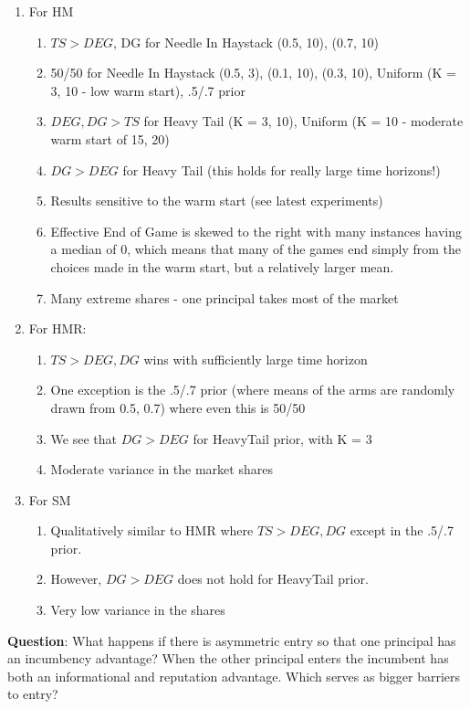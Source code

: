 \documentclass[11pt,letterpaper]{article}
\begin{document}
\begin{enumerate}
\item For HM
\begin{enumerate}
\item $TS > DEG$, DG for Needle In Haystack (0.5, 10), (0.7, 10)
\item 50/50 for Needle In Haystack (0.5, 3), (0.1, 10), (0.3, 10),  Uniform (K = 3, 10 - low warm start), .5/.7 prior
\item $DEG, DG > TS$ for Heavy Tail (K = 3, 10), Uniform (K = 10 - moderate warm start of 15, 20)
\item $DG > DEG$ for Heavy Tail (this holds for really large time horizons!)
\item Results sensitive to the warm start (see latest experiments)
\item Effective End of Game is skewed to the right with many instances having a median of  0, which means that many of the games end simply from the choices made in the warm start, but a relatively larger mean.
\item Many extreme shares - one principal takes most of the market
\end{enumerate}
\item For HMR:
\begin{enumerate}
\item $TS > DEG, DG$ wins with sufficiently large time horizon 
\item One exception is the .5/.7 prior (where means of the arms are randomly drawn from {0.5, 0.7}) where even this is 50/50
\item We see that $DG > DEG$ for HeavyTail prior, with K = 3
\item Moderate variance in the market shares
\end{enumerate}
\item For SM

\begin{enumerate}
\item Qualitatively similar to HMR where $TS > DEG, DG$ except in the .5/.7 prior.
\item However, $DG > DEG$ does not hold for HeavyTail prior.
\item Very low variance in the shares
\end{enumerate}

\end{enumerate}

\textbf{Question}: What happens if there is asymmetric entry so that one principal has an incumbency advantage? When the other principal enters the incumbent has both an informational and reputation advantage. Which serves as bigger barriers to entry?
\end{document}
